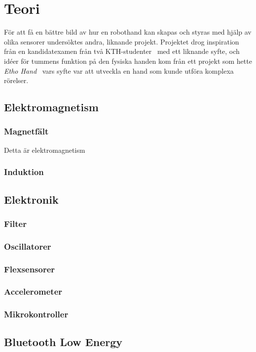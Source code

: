 \documentclass[a4paper]{article}
\begin{document}
\begin{sloppypar}
    \section{Teori}
    För att få en bättre bild av hur en robothand kan skapas och styras med hjälp av olika sensorer undersöktes andra, liknande projekt.
    Projektet drog inspiration från en kandidatexamen från två KTH-studenter~\cite{KTHhand} med ett liknande syfte, och
    idéer för tummens funktion på den fysiska handen kom från ett projekt som hette \textit{Etho Hand}~\cite{EthoHand}
    vars syfte var att utveckla en hand som kunde utföra komplexa rörelser.

    \subsection{Elektromagnetism}
    \subsubsection{Magnetfält}
    Detta är elektromagnetism
    \subsubsection{Induktion}

    \subsection{Elektronik}
    \subsubsection{Filter}
    \subsubsection{Oscillatorer}
    \subsubsection{Flexsensorer}
    \subsubsection{Accelerometer}
    \subsubsection{Mikrokontroller}

    \subsection{Bluetooth Low Energy}

\end{sloppypar}
\end{document}
